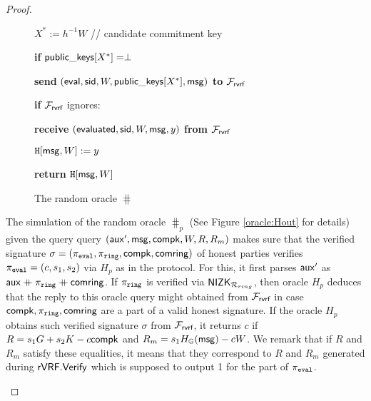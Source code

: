 \begin{proof}
\begin{itemize}
\begin{figure}
\begin{minipage}{0.6\textwidth}
{{						{$ X^* := h^{-1}W $ // candidate commitment key} 
						
						
						{\textbf{if} $ {\mathsf{public\_keys}}[X^*]  = \perp$}
						
						\tabdbl{$ \pk^* \leftsample \grE $} %
						
						\tabdbl{$ \pkeys[X^*] := \pk^* $}
						
						{\textbf{send} $ (\mathsf{eval}, \textsf{sid}, W, {\mathsf{public\_keys}}[X^*] , \mathsf{msg}) $ \textbf{to} $ \mathcal{F}_{\textsf{rvrf}} $}
						
						{\textbf{if} $ \mathcal{F}_{\textsf{rvrf}} $ ignores: }
						
						{\textbf{receive} $ (\mathsf{evaluated}, \textsf{sid}, W, \mathsf{msg}, y) $ \textbf{from} $ \mathcal{F}_{\textsf{rvrf}} $}
						
						{$ \mathtt{H}[\mathsf{msg}, W]:=y $}
						
%						
%						
						
						
						\textbf{return $ \mathtt{H}[\mathsf{msg},  W] $}
						
				}}	
				\caption{The random oracle $ \hash $}
				\label{oracle:HnoPK}
			\end{minipage}
		\end{figure}
		


		The simulation of the random oracle $ \hash_p $ (See Figure \ref{oracle:Hout} for details) given the query  query $ (\mathsf{aux}', \mathsf{msg},\mathsf{compk},W,R,R_m)  $ makes sure that the verified signature $ \sigma = (\pi_{\mathtt{eval}}, \pi_{\mathtt{ring}}, \mathsf{compk}, \mathsf{comring}) $ of honest parties verifies $ \pi_{\mathtt{eval}} = (c, s_1,s_2) $ via $ H_p $ as in the protocol. For this, it first parses $ \mathsf{aux}' $ as $\mathsf{aux} \mathbin{+\mkern-10mu+} \pi_{\mathtt{ring}} \mathbin{+\mkern-10mu+} \mathsf{comring} $. If $ \pi_{\mathtt{ring}} $ is verified via $ {\mathsf{NIZK}}_{\mathcal{R}_{ring}} $, then oracle $ H_p $ deduces that the reply to this oracle query might obtained from $ \mathcal{F}_{\textsf{rvrf}} $ in case $ \mathsf{compk},\pi_{\mathtt{ring}},\mathsf{comring} $ are  a part of a valid honest signature.
		 If the oracle $ H_p $ obtains such verified signature $ \sigma $ from $ \mathcal{F}_{\textsf{rvrf}} $, it returns $ c $ if $ R = s_1 G + s_2 K - c \mathsf{compk} $ and $ R_m = s_1 H_{\mathbb{G}}(\mathsf{msg}) - cW $. We remark that if $ R $ and $ R_m $ satisfy these equalities, it means that they correspond to $ R $ and $ R_m $ generated during $ {\mathsf{rVRF}}.{\mathsf{Verify}} $ which is supposed to output 1  for the part of $ \pi_{\mathtt{eval}} $.
		 

\end{itemize}
\end{proof}

